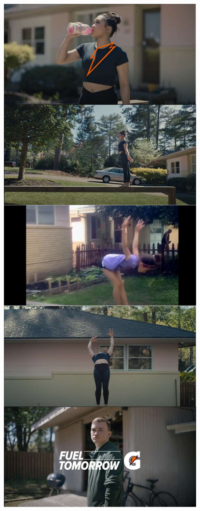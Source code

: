 \begin{figure}[!h]

    \begin{minipage}[c]{0.26\textwidth}
        \centering
        \includegraphics[width=\textwidth]{images/listing-video_compressed.pdf}

\end{minipage}
\end{figure}
